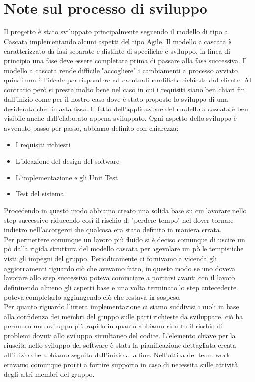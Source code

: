 \documentclass[a4paper, 11pt,oneside]{book}
\begin{document}
\chapter{Note sul processo di sviluppo}
    Il progetto è stato sviluppato principalmente seguendo il modello di tipo a Cascata implementando alcuni aspetti del tipo Agile.
    Il modello a cascata è caratterizzato da fasi separate e distinte di specifiche e sviluppo, in linea di principio una fase deve essere completata prima di passare alla fase successiva. Il modello a cascata rende difficile "accogliere" i cambiamenti a processo avviato quindi non è l'ideale per rispondere ad eventuali modifiche
    richieste dal cliente. Al contrario però si presta molto bene nel caso in cui i requisiti siano ben chiari fin dall'inizio come per il nostro caso dove è stato proposto lo sviluppo di una desiderata che rimasta fissa. Il fatto dell'applicazione del modello a cascata è ben visibile anche dall'elaborato appena sviluppato. Ogni aspetto
    dello sviluppo è avvenuto passo per passo, abbiamo definito con chiarezza:
    \begin{itemize}
        \item I requisiti richiesti
        \item L'ideazione del design del software
        \item L'implementazione e gli Unit Test
        \item Test del sistema
    \end{itemize}
    Procedendo in questo modo abbiamo creato una solida base su cui lavorare nello step successivo riducendo così il rischio di "perdere tempo" nel dover tornare indietro  nell'accorgerci che qualcosa era stato definito in maniera errata. \\
    Per permettere comunque un lavoro più fluido si è deciso comunque di uscire un pò dalla rigida struttura del modello cascata per agevolare un pò le tempistiche visti gli impegni del gruppo. Periodicamente ci fornivamo a vicenda gli aggiornamenti riguardo ciò che avevamo
    fatto, in questo modo se uno doveva lavorare allo step successivo poteva cominciare a portarsi avanti con il lavoro defininendo almeno gli aspetti base e una volta terminato lo step antecedente poteva completarlo aggiungendo ciò che restava in sospeso.\\
    Per quanto riguardo l'intera implementazione ci siamo suddivisi i ruoli in base alla confidenza dei membri del gruppo sulle parti richieste da sviluppare, ciò ha permesso uno sviluppo più rapido in quanto abbiamo ridotto il rischio di problemi dovuti allo sviluppo simultaneo del codice. L'elemento chiave per la riuscita nello sviluppo del 
    software è stata la pianificazione dettagliata creata all'inizio che abbiamo seguito dall'inizio alla fine. Nell'ottica del team work eravamo comunque pronti a fornire supporto in caso di necessita sulle attività degli altri membri del gruppo.
\end{document}
